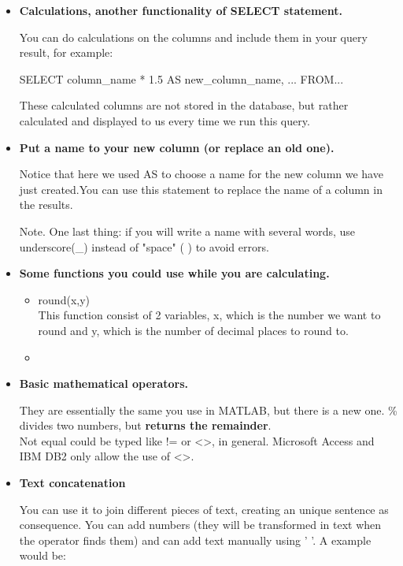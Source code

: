 \documentclass[10pt, oneside]{article}
\begin{document}
\begin{itemize}
	\item \textbf{Calculations, another functionality of SELECT statement.}
	
	You can do calculations on the columns and include them in your query result, for example:
	
	\begin{center}
		SELECT column\_name * 1.5 AS new\_column\_name, ... FROM...
	\end{center}

	These calculated columns are not stored in the database, but rather calculated and displayed to us every time we run this query.
	
	\item \textbf{Put a name to your new column (or replace an old one).}
	
	Notice that here we used AS to choose a name for the new column we have just created.You can use this statement to replace the name of a column in the results. 
	 
	 \color{blue}Note. \color{black}One last thing: if you will write a name with several words, use underscore(\_) instead of "space" ( ) to avoid errors.
	 
	\item \textbf{Some functions you could use while you are calculating.}
	
	\begin{itemize}
		\item round(x,y) 
		\\
		
		This function consist of 2 variables, x, which is the number we want to round and y, which is the number of decimal places to round to.
		
		\item 
		
	\end{itemize}
	
	\item \textbf{Basic mathematical operators.}
	
	They are essentially the same you use in MATLAB, but there is a new one. \% divides two numbers, but \textbf{returns the remainder}.
	\\
	Not equal could be typed like != or <>, in general. Microsoft Access and IBM DB2 only allow the use of <>.
	
    \item \textbf{Text concatenation}
    
    You can use it to join different pieces of text, creating an unique sentence as consequence. You can add numbers (they will be transformed in text when the operator finds them) and can add text manually using ' '. A example would be:
    

\end{itemize}
\end{document}
